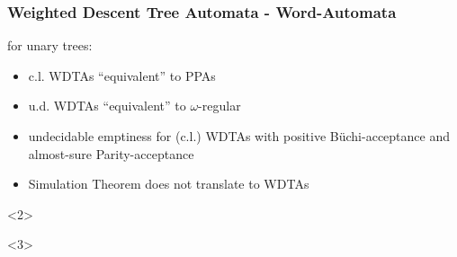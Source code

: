 \documentclass{beamer}
\begin{document}
  \begin{frame}
    \frametitle{Weighted Descent Tree Automata - Word-Automata}
    for unary trees:
    \begin{itemize}
      \item<2-> c.l. \acp{WDTA} \enquote{equivalent} to \acp{PPA}
      \item<3-> u.d. \acp{WDTA} \enquote{equivalent} to $\omega$-regular
      \item[$\Rightarrow$]<4-> undecidable emptiness for (c.l.) \acp{WDTA}
        with positive Büchi-acceptance and almost-sure Parity-acceptance
      \item[$\Rightarrow$]<5-> Simulation Theorem does not translate to
        \acp{WDTA}
    \end{itemize}
    \begin{overlayarea}{\textwidth}{0.5\textheight}
      \begin{center}
        \begin{onlyenv}<2>
        \end{onlyenv}
        \begin{onlyenv}<3>
        \end{onlyenv}
      \end{center}
    \end{overlayarea}

\end{frame}
\end{document}
